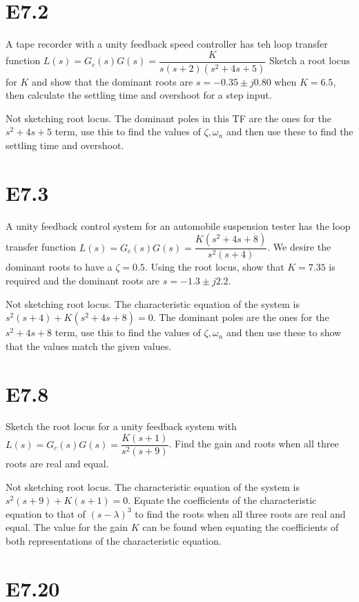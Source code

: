 \documentclass[11pt]{article}
\begin{document}
\section{E7.2}

A tape recorder with a unity feedback speed controller has teh loop transfer function $L(s) = G_c(s) G(s) = \dfrac{K}{s(s+ 2)(s^2 + 4s + 5)}$ Sketch a root locus for $K$ and show that the dominant roots are $s = -0.35 \pm j 0.80$ when $K = 6.5$, then calculate the settling time and overshoot for a step input.

Not sketching root locus. The dominant poles in this TF are the ones for the $s^2 + 4s + 5$ term, use this to find the values of $\zeta, \omega_n$ and then use these to find the settling time and overshoot.

\section{E7.3}

A unity feedback control system for an automobile suspension tester has the loop transfer function $L(s) = G_c(s) G(s) = \dfrac{K(s^2 + 4s + 8)}{s^2(s + 4)}$. We desire the dominant roots to have a $\zeta = 0.5$. Using the root locus, show that $K = 7.35$ is required and the dominant roots are $s = -1.3 \pm j 2.2$.

Not sketching root locus. The characteristic equation of the system is $s^2 (s + 4) + K(s^2 + 4s + 8) = 0$. The dominant poles are the ones for the $s^2 + 4s + 8$ term, use this to find the values of $\zeta, \omega_n$ and then use these to show that the values match the given values.

\section{E7.8}

Sketch the root locus for a unity feedback system with $L(s) = G_c(s) G(s) = \dfrac{K(s + 1)}{s^2 (s + 9)}$. Find the gain and roots when all three roots are real and equal.

Not sketching root locus. The characteristic equation of the system is $s^2 (s + 9) + K(s + 1) = 0$. Equate the coefficients of the characteristic equation to that of $(s - \lambda)^3$ to find the roots when all three roots are real and equal. The value for the gain $K$ can be found when equating the coefficients of both representations of the characteristic equation.

\section{E7.20}
\end{document}
